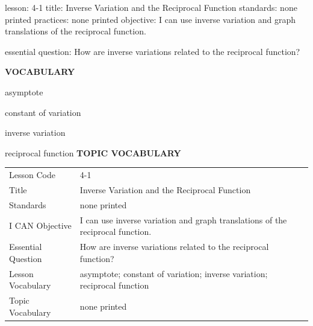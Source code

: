 \documentclass{article}
\newenvironment{lesson-meta}{}{}        %
\newcommand{\te}[1]{}                   %
\begin{document}
\begin{lesson-meta}
lesson: 4-1
title: Inverse Variation and the Reciprocal Function
standards: none printed
practices: none printed
objective: I can use inverse variation and graph translations of the reciprocal function.

essential question: How are inverse variations related to the reciprocal function?

\textbf{VOCABULARY}
\item asymptote
\item constant of variation
\item inverse variation
\item reciprocal function
\textbf{TOPIC VOCABULARY}
\te{No separate topic vocabulary list is printed on these lesson pages.}
\begin{tabular}{ll}
Lesson Code & 4-1 \\
Title & Inverse Variation and the Reciprocal Function \\
Standards & none printed \\
I CAN Objective & I can use inverse variation and graph translations of the reciprocal function. \\
Essential Question & How are inverse variations related to the reciprocal function? \\
Lesson Vocabulary & asymptote; constant of variation; inverse variation; reciprocal function \\
Topic Vocabulary & none printed \\
\end{tabular}
\end{lesson-meta}
\end{document}

